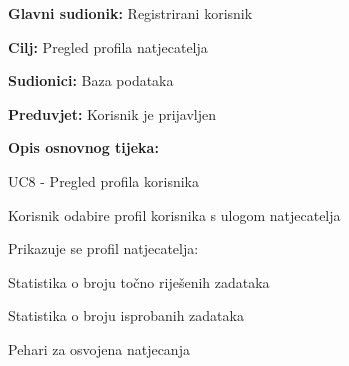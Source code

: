 					
					\noindent {}
					\begin{packed_item}
						
						\item \textbf{Glavni sudionik: }Registrirani korisnik
						\item  \textbf{Cilj:} Pregled profila natjecatelja
						\item  \textbf{Sudionici:} Baza podataka
						\item  \textbf{Preduvjet: } Korisnik je prijavljen
						\item  \textbf{Opis osnovnog tijeka:}
						
						\item[] \begin{packed_enum}
							
							\item UC8 - Pregled profila korisnika
							\item Korisnik odabire profil korisnika s ulogom natjecatelja
							\item Prikazuje se profil natjecatelja:
								\item[] \begin{packed_enum}
								\item Statistika o broju točno riješenih zadataka
								\item Statistika o broju isprobanih zadataka 
								\item Pehari za osvojena natjecanja
								
							\end{packed_enum}
						\end{packed_enum}
					\end{packed_item}
					
